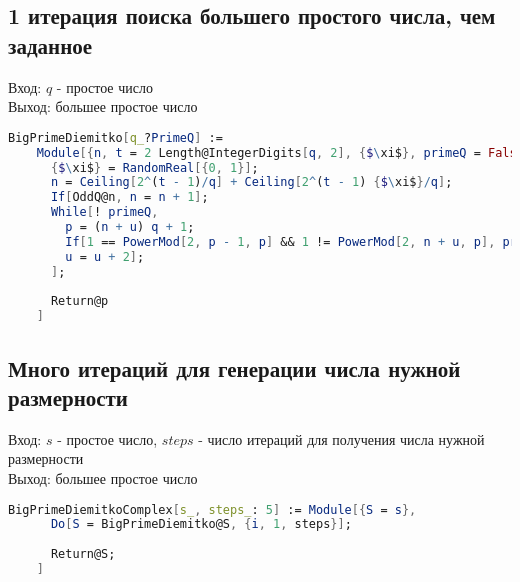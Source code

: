     \subsection{1 итерация поиска большего простого числа, чем заданное}

      Вход: {$q$} - простое число \\
      Выход: большее простое число

      \begin{lstlisting}[language=Mathematica,caption={
	Теорема Диемитко (1 итерация)
      }]
	BigPrimeDiemitko[q_?PrimeQ] := 
	Module[{n, t = 2 Length@IntegerDigits[q, 2], {$\xi$}, primeQ = False, u = 0, p},
	  {$\xi$} = RandomReal[{0, 1}];
	  n = Ceiling[2^(t - 1)/q] + Ceiling[2^(t - 1) {$\xi$}/q];
	  If[OddQ@n, n = n + 1];
	  While[! primeQ,
	    p = (n + u) q + 1;
	    If[1 == PowerMod[2, p - 1, p] && 1 != PowerMod[2, n + u, p], primeQ = True,
	    u = u + 2];
	  ];
	
	  Return@p
	]
      \end{lstlisting}

    \subsection{Много итераций для генерации числа нужной размерности}
    
      Вход: {$s$} - простое число, {$steps$} - число итераций для получения числа нужной размерности \\
      Выход: большее простое число

      \begin{lstlisting}[language=Mathematica,caption={
	  Теорема Диемитко (много итераций)
      }]
	BigPrimeDiemitkoComplex[s_, steps_: 5] := Module[{S = s},
	  Do[S = BigPrimeDiemitko@S, {i, 1, steps}];
  
	  Return@S;
	]
      \end{lstlisting}